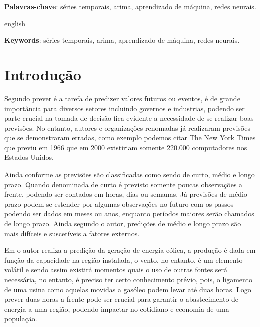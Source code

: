 \documentclass[
	12pt,
	oneside,
	a4paper,
	english,
	brazil
]{abntex2}
\begin{document}
\frenchspacing

\imprimircapa{}

\imprimirfolhaderosto{}

\begin{resumo}

    \textbf{Palavras-chave}: séries temporais, arima, aprendizado de máquina, 
    redes neurais.
\end{resumo}

\begin{resumo}[Abstract]
    \begin{otherlanguage*}{english}

        \textbf{Keywords}: séries temporais, arima, aprendizado de máquina, 
        redes neurais.
    \end{otherlanguage*}
\end{resumo}

\textual{}

\tableofcontents*
\cleardoublepage{}

\chapter{Introdução}

Segundo  prever é a tarefa de predizer valores futuros ou 
eventos, é de grande importância para diversos setores incluindo governos e 
industrias, podendo ser parte crucial na tomada de decisão fica evidente a 
necessidade de se realizar boas previsões. No entanto, autores e organizações 
renomadas já realizaram previsões que se demonstraram erradas, como exemplo 
podemos citar The New York Times que previu em 1966 que em 2000 existiriam 
somente 220.000 computadores nos Estados Unidos.

Ainda conforme  as previsões são classificadas como sendo de 
curto, médio e longo prazo. Quando denominada de curto é previsto somente poucas 
observações a frente, podendo ser contados em horas, dias ou semanas. Já 
previsões de médio prazo podem se estender por algumas observações no futuro com 
os passos podendo ser dados em meses ou anos, enquanto períodos maiores serão 
chamados de longo prazo. Ainda segundo o autor, predições de médio e longo prazo 
são mais difíceis e suscetíveis a fatores externos.

Em  o autor realiza a predição da geração de energia 
eólica, a produção é dada em função da capacidade na região instalada, o vento, 
no entanto, é um elemento volátil e sendo assim existirá momentos quais o uso de 
outras fontes será necessária, no entanto, é preciso ter certo conhecimento 
prévio, pois, o ligamento de uma usina como aquelas movidas a gasóleo podem 
levar até duas horas. Logo prever duas horas a frente pode ser crucial para 
garantir o abastecimento de energia a uma região, podendo impactar no cotidiano 
e economia de uma população.
\end{document}
